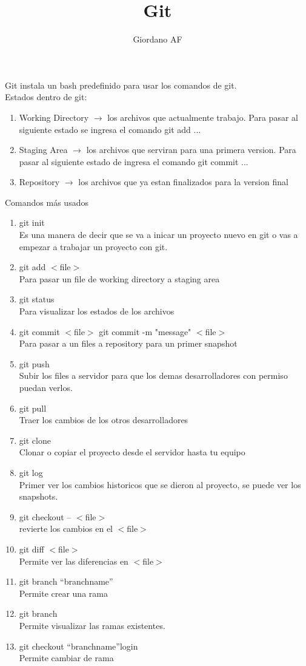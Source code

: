 \documentclass{book}
\title{\Huge Git}
\author{Giordano AF}
\date{}
\begin{document}
	
	\maketitle

	Git instala un bash predefinido para usar los comandos de git. \\
	Estados dentro de git:
\begin{enumerate}
	\item Working Directory $\rightarrow$ los archivos que actualmente trabajo. Para pasar al siguiente estado se ingresa el comando git add ...
	\item Staging Area $\rightarrow$  los archivos que serviran para una primera version. Para pasar al siguiente estado de ingresa el comando git commit ...
	\item Repository $\rightarrow$ los archivos que ya estan finalizados para la version final
\end{enumerate}
	Comandos m\'as usados
\begin{enumerate}
	\item git init \\
	Es una manera de decir que se va a inicar un proyecto nuevo en git o vas a empezar a trabajar un proyecto con git.
	\item git add $<$file$>$ \\
	Para pasar un file de working directory a staging area
	\item git status \\
	Para visualizar los estados de los archivos
	\item git commit $<$file$>$ git commit -m "message" $<$file$>$\\
	Para pasar a un files a repository para un primer snapshot
	\item git push \\
	Subir los files a servidor para que los demas desarrolladores con permiso puedan verlos.
	\item git pull \\
	Traer los cambios de los otros desarrolladores 
	\item git clone \\
	Clonar o copiar	el proyecto desde el servidor hasta tu equipo
	\item git log\\
	Primer ver los cambios historicos que se dieron al proyecto, se puede ver los snapshots.
	\item git checkout -- $<$file$>$\\
	revierte los cambios en el  $<$file$>$
	\item git diff $<$file$>$\\
	Permite ver las diferencias en $<$file$>$
	\item git branch ``branchname''\\
	Permite crear una rama
	\item git branch \\
	Permite visualizar las ramas existentes.
	\item git checkout ``branchname''login \\
	Permite cambiar de rama
	
\end{enumerate}
\end{document}
